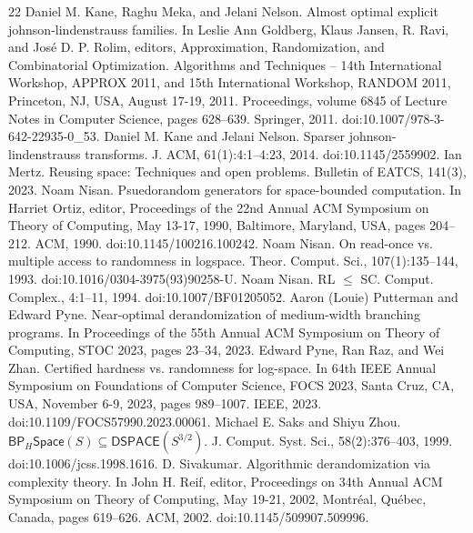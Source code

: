 \begin{thebibliography}{22}
 Daniel M. Kane, Raghu Meka, and Jelani Nelson. Almost optimal explicit johnson-lindenstrauss families. In Leslie Ann Goldberg, Klaus Jansen, R. Ravi, and José D. P. Rolim, editors, Approximation, Randomization, and Combinatorial Optimization. Algorithms and Techniques – 14th International Workshop, APPROX 2011, and 15th International Workshop, RANDOM 2011, Princeton, NJ, USA, August 17-19, 2011. Proceedings, volume 6845 of Lecture Notes in Computer Science, pages 628–639. Springer, 2011. doi:10.1007/978-3-642-22935-0\_53.
 Daniel M. Kane and Jelani Nelson. Sparser johnson-lindenstrauss transforms. J. ACM, 61(1):4:1–4:23, 2014. doi:10.1145/2559902.
 Ian Mertz. Reusing space: Techniques and open problems. Bulletin of EATCS, 141(3), 2023.
 Noam Nisan. Psuedorandom generators for space-bounded computation. In Harriet Ortiz, editor, Proceedings of the 22nd Annual ACM Symposium on Theory of Computing, May 13-17, 1990, Baltimore, Maryland, USA, pages 204–212. ACM, 1990. doi:10.1145/100216.100242.
 Noam Nisan. On read-once vs. multiple access to randomness in logspace. Theor. Comput. Sci., 107(1):135–144, 1993. doi:10.1016/0304-3975(93)90258-U.
 Noam Nisan. RL $\leq$ SC. Comput. Complex., 4:1–11, 1994. doi:10.1007/BF01205052.
 Aaron (Louie) Putterman and Edward Pyne. Near-optimal derandomization of medium-width branching programs. In Proceedings of the 55th Annual ACM Symposium on Theory of Computing, STOC 2023, pages 23–34, 2023.
 Edward Pyne, Ran Raz, and Wei Zhan. Certified hardness vs. randomness for log-space. In 64th IEEE Annual Symposium on Foundations of Computer Science, FOCS 2023, Santa Cruz, CA, USA, November 6-9, 2023, pages 989–1007. IEEE, 2023. doi:10.1109/FOCS57990.2023.00061.
 Michael E. Saks and Shiyu Zhou. $\mathsf{BP}_H\mathsf{Space}(S)\subseteq\mathsf{DSPACE}(S^{3/2})$. J. Comput. Syst. Sci., 58(2):376–403, 1999. doi:10.1006/jcss.1998.1616.
 D. Sivakumar. Algorithmic derandomization via complexity theory. In John H. Reif, editor, Proceedings on 34th Annual ACM Symposium on Theory of Computing, May 19-21, 2002, Montréal, Québec, Canada, pages 619–626. ACM, 2002. doi:10.1145/509907.509996.
\end{thebibliography}
